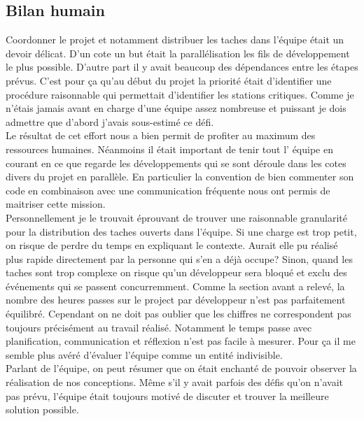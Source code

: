 \documentclass[10pt,a4paper]{book}
\begin{document}
\subsection{Bilan humain}
Coordonner le projet et notamment distribuer les taches dans l'équipe était un devoir délicat. D'un cote un but était la parallélisation les fils de développement le plus possible. D'autre part il y avait beaucoup des dépendances entre les étapes prévus. C'est pour ça qu'au début du projet la priorité était d'identifier une procédure raisonnable qui permettait d'identifier les stations critiques. Comme je n'étais jamais avant en charge d'une équipe assez nombreuse et puissant je dois admettre que d'abord j'avais sous-estimé ce défi.\\ Le résultat de cet effort nous a bien permit de profiter au maximum des ressources humaines. Néanmoins il était important de tenir tout l' équipe en courant en ce que regarde les développements qui se sont déroule dans les cotes divers du projet en parallèle. En particulier la convention de bien commenter son code en combinaison avec une communication fréquente nous ont permis de maitriser cette mission.\\Personnellement je le trouvait éprouvant de trouver une raisonnable granularité pour la distribution des taches ouverts dans l'équipe. Si une charge est trop petit, on risque de perdre du temps en expliquant le contexte. Aurait elle pu réalisé plus rapide directement par la personne qui s'en a déjà occupe? Sinon, quand les taches sont trop complexe on risque qu'un développeur sera bloqué et exclu des événements qui se passent concurremment. Comme la section avant a relevé, la nombre des heures passes sur le project par développeur n'est pas parfaitement équilibré. Cependant on ne doit pas oublier que les chiffres ne correspondent pas toujours précisément au travail réalisé. Notamment le temps passe avec planification, communication et réflexion n'est pas facile à mesurer. Pour ça il me semble plus avéré d'évaluer l'équipe comme un entité indivisible.\\
Parlant de l'équipe, on peut résumer que on était enchanté de pouvoir observer la réalisation de nos conceptions. Même s'il y avait parfois des défis qu'on n'avait pas prévu, l'équipe était toujours motivé de discuter et trouver la meilleure solution possible.
\end{document}
